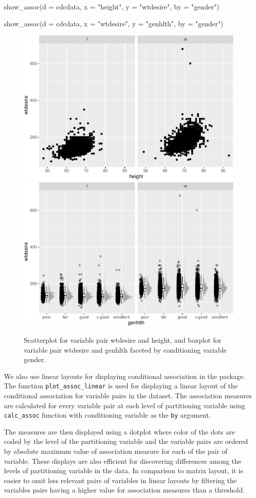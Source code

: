 \begin{Schunk}
\begin{Sinput}
show_assoc(d = cdcdata,
           x = "height",
           y = "wtdesire",
           by = "gender")

show_assoc(d = cdcdata,
           x = "wtdesire",
           y = "genhlth",
           by = "gender")
\end{Sinput}
\begin{figure}
\includegraphics[width=0.5\linewidth]{rj_paper_files/figure-latex/int-pairs-conditional-cdc-1} \includegraphics[width=0.5\linewidth]{rj_paper_files/figure-latex/int-pairs-conditional-cdc-2} \caption[Scatterplot for variable pair wtdesire and height, and boxplot for variable pair wtdesire and genhlth faceted by conditioning variable gender]{Scatterplot for variable pair wtdesire and height, and boxplot for variable pair wtdesire and genhlth faceted by conditioning variable gender.}\label{fig:int-pairs-conditional-cdc}
\end{figure}
\end{Schunk}

We also use linear layouts for displaying conditional association in the
package. The function \texttt{plot\_assoc\_linear} is used for
displaying a linear layout of the conditional association for variable
pairs in the dataset. The association measures are calculated for every
variable pair at each level of partitioning variable using
\texttt{calc\_assoc} function with conditioning variable as the
\texttt{by} argument.

The measures are then displayed using a dotplot where color of the dots
are coded by the level of the partitioning variable and the variable
pairs are ordered by absolute maximum value of association measure for
each of the pair of variable. These displays are also efficient for
discovering differences among the levels of partitioning variable in the
data. In comparison to matrix layout, it is easier to omit less relevant
pairs of variables in linear layouts by filtering the variables pairs
having a higher value for association measures than a threshold.

